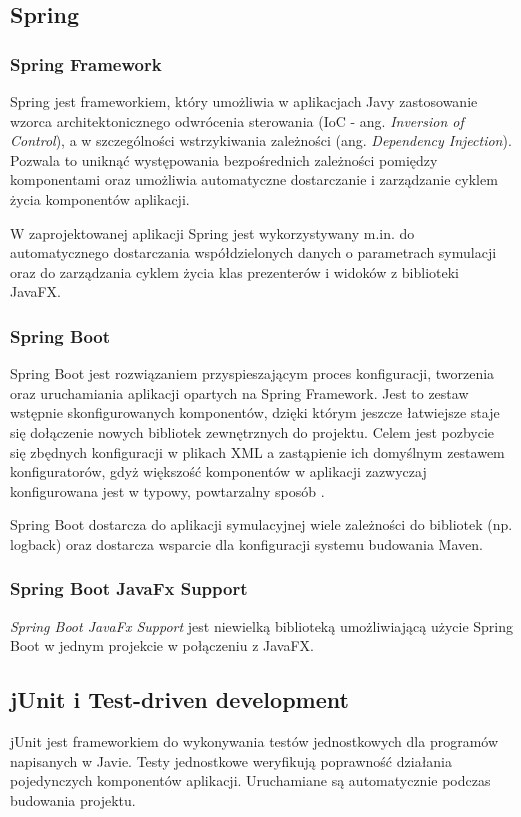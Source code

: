 \subsection{Spring}
\subsubsection{Spring Framework}
Spring jest frameworkiem, który umożliwia w aplikacjach Javy zastosowanie wzorca architektonicznego odwrócenia sterowania (IoC - ang. {\it Inversion of Control}), a w szczególności wstrzykiwania zależności (ang. {\it Dependency Injection}). Pozwala to uniknąć występowania bezpośrednich zależności pomiędzy komponentami oraz umożliwia automatyczne dostarczanie i zarządzanie cyklem życia komponentów aplikacji.

W zaprojektowanej aplikacji Spring jest wykorzystywany m.in. do automatycznego dostarczania współdzielonych danych o parametrach symulacji oraz do zarządzania cyklem życia klas prezenterów i widoków z biblioteki JavaFX.

\subsubsection{Spring Boot}
Spring Boot jest rozwiązaniem przyspieszającym proces konfiguracji, tworzenia oraz uruchamiania aplikacji opartych na Spring Framework.
Jest to zestaw wstępnie skonfigurowanych komponentów, dzięki którym jeszcze łatwiejsze staje się dołączenie nowych bibliotek zewnętrznych do projektu. Celem jest pozbycie się zbędnych konfiguracji w plikach XML a zastąpienie ich domyślnym zestawem konfiguratorów, gdyż większość komponentów w aplikacji zazwyczaj konfigurowana jest w typowy, powtarzalny sposób \cite{docs-springboot}.

Spring Boot dostarcza do aplikacji symulacyjnej wiele zależności do bibliotek (np. logback) oraz dostarcza wsparcie dla konfiguracji systemu budowania Maven.
\subsubsection{Spring Boot JavaFx Support}
{\it Spring Boot JavaFx Support} jest niewielką biblioteką umożliwiającą użycie Spring Boot w jednym projekcie w połączeniu z JavaFX.

\subsection{jUnit i Test-driven development}
\label{ch:junit-tdd}
jUnit jest frameworkiem do wykonywania testów jednostkowych dla programów napisanych w Javie. Testy jednostkowe weryfikują poprawność działania pojedynczych komponentów aplikacji. Uruchamiane są automatycznie podczas budowania projektu.

